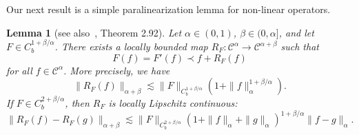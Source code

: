 \documentclass[11pt,a4paper]{article}
\newtheorem{lemma}[theorem]{Lemma}
\theoremstyle{remark}
\newcommand{\CC}{\ensuremath{\mathscr{C}}}
\begin{document}
Our next result is a simple paralinearization lemma for non-linear operators.

\begin{lemma}[see also~\cite{Bahouri2011}, Theorem 2.92]\label{lemma:paralinearization}
  Let $\alpha \in (0,1)$, $\beta \in (0,\alpha]$, and let $F \in C^{1+\beta/\alpha}_b$. There exists a locally bounded map $R_{F} \colon  \CC^{\alpha} \rightarrow \CC^{\alpha+\beta}$ such that
  \begin{equation}\label{eq:para-linearization}
    F ( f ) =F' ( f ) \prec f+R_{F} ( f )
  \end{equation}
  for all $f \in \CC^{\alpha}$. More precisely, we have
  \[
     \| R_{F} ( f ) \|_{\alpha + \beta} \lesssim \|F\|_{C^{1+\beta/\alpha}_b} (1 + \| f \|_{\alpha}^{1+\beta/\alpha}).
  \]
  If $F \in C_b^{2+\beta/\alpha}$, then $R_{F}$ is locally Lipschitz continuous:
  \[
     \| R_{F} ( f ) -R_{F} ( g ) \|_{\alpha + \beta} \lesssim \|F\|_{C^{2+\beta/\alpha}_b} ( 1+ \| f \|_{\alpha} + \| g \|_{\alpha})^{1+\beta/\alpha} \| f - g \|_\alpha.
  \]
\end{lemma}
\end{document}
